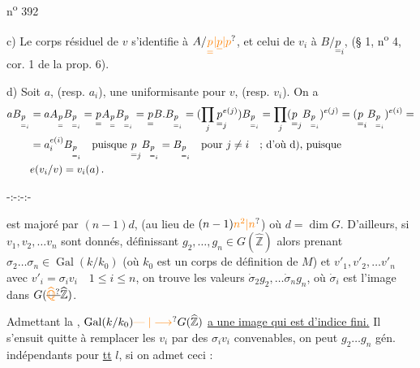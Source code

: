 \hfill n\textsuperscript{o} 392

c) Le corps résiduel de $v$ s'identifie à $A/\unsure{\underset{=}{p}|\underline{p}|p}$, et celui de $v_i$ à $B/\underset{=}{p}_i$, (§ 1, n\textsuperscript{o} 4, cor. 1 de la prop. 6).

d) Soit $a$, (resp. $a_i$), une uniformisante pour $v$, (resp. $v_i$). On a
\[
\begin{aligned}
aB_{\underset{=}{p}_i}&=aA_{\underset{=}{p}}B_{\underset{=}{p}_i}
=\underset{=}{p}A_{\underset{=}{p}}B_{\underset{=}{p}_i}
=\underset{=}{p}B.B_{\underset{=}{p}_i}
=(\prod_{j}\underset{=}{p}_j^{e(j)})B_{\underset{=}{p}_i}
=\prod_{j}(\underset{=}{p}_j B_{\underset{=}{p}_i})^{e(j)}
=(\underset{=}{p}_i B_{\underset{=}{p}_i})^{e(i)}=\\
&=a_i^{e(i)}B_{\underset{=}{p}_i}\quad\text{puisque }\underset{=}{p}_jB_{\underset{=}{p}_i}=B_{\underset{=}{p}_i}\quad\text{pour }j\ne i\quad\text{; d'où d), puisque}\\
&e(v_i/v)=v_i(a)\,.
\end{aligned}
\]

\begin{center}-:-:-:-\end{center}
est majoré par $(n-1)d$, (au lieu de $(n-1)\unsure{n^2|n}$) où $d=\dim G$.  D'ailleurs, si $v_1,v_2,\ldots v_n$ sont donnés,   définissant $g_2,\ldots,g_n\in G(\widehat{\mathbb Z})$
alors prenant $\sigma_2\ldots\sigma_n\in\operatorname{Gal}(k/k_0)$ (où $k_0$ est un corps de définition  de $M$) et $v'_1,v'_2,\ldots v'_n$ avec $v'_i=\sigma_i v_i\quad 1\leq i\leq n$, on trouve les valeurs  $\dot{\sigma}_2g_2,\ldots\dot{\sigma}_ng_n$, où $\dot{\sigma}_i$ est l'image dans $G(\deleted{\unsure{\widehat{\mathbb Q}}}\widehat{\mathbb Z})$. 

Admettant la , $\operatorname{Gal}(k/k_0)\unsure{\mathrel{\text{---}}|\longrightarrow}G(\widehat{\mathbb Z})$ \uline{a une image qui est d'indice fini.}
Il s'ensuit  quitte à remplacer les $v_i$ par des $\sigma_i v_i$ convenables, on peut   $g_2\ldots g_n$ gén. indépendants pour \uline{tt} $l$, si on admet ceci :

